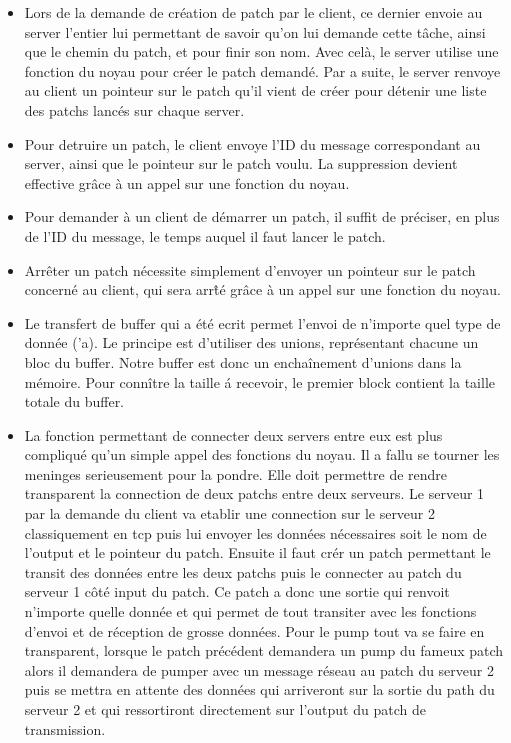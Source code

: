 \begin{itemize}

\item Lors de la demande de cr\'eation de patch par le client, ce dernier 
envoie au server l'entier lui permettant de savoir qu'on lui demande cette 
t\^ache, ainsi que le chemin du patch, et pour finir son nom. Avec cel\`a, le 
server utilise une fonction du noyau pour cr\'eer le patch demand\'e. Par
a suite, le server renvoye au client un pointeur sur le patch qu'il vient de 
cr\'eer pour d\'etenir une liste des patchs lanc\'es sur chaque server.
\newline
\item Pour detruire un patch, le client envoye l'ID du message correspondant 
au server, ainsi que le pointeur sur le patch voulu. La suppression devient 
effective gr\^ace \`a un appel sur une fonction du noyau.
\newline
\item Pour demander \`a un client de d\'emarrer un patch, il suffit de 
pr\'eciser, en plus de l'ID du message, le temps auquel il faut lancer le 
patch.
\newline
\item Arr\^eter un patch n\'ecessite simplement d'envoyer un pointeur sur le 
patch concern\'e au client, qui sera arr\^t\'e gr\^ace \`a un appel sur une 
fonction du noyau.
\newline
\item Le transfert de buffer qui a \'et\'e ecrit permet l'envoi de n'importe
quel type de donn\'ee ('a). Le principe est d'utiliser des unions, 
repr\'esentant chacune un bloc du buffer. Notre buffer est donc un 
encha\^inement d'unions dans la m\'emoire. Pour conn\^itre la taille \'a 
recevoir, le premier block contient la taille totale du buffer. 
\newline
\item La fonction permettant de connecter deux servers entre eux est plus compliqu\'e qu'un simple appel des fonctions du noyau. Il a fallu se tourner les meninges serieusement pour la pondre. Elle doit permettre de rendre transparent la connection de deux patchs entre deux serveurs. Le serveur 1 par la demande du client va etablir une connection sur le serveur 2 classiquement en tcp puis lui envoyer les donn\'ees n\'ecessaires soit le nom de l'output et le pointeur du patch. Ensuite il faut cr\'er un patch permettant le transit des donn\'ees entre les deux patchs puis le connecter au patch du serveur 1 c\^ot\'e input du patch. Ce patch a donc une sortie qui renvoit n'importe quelle donn\'ee et qui permet de tout transiter avec les fonctions d'envoi et de r\'eception de grosse donn\'ees. Pour le pump tout va se faire en transparent, lorsque le patch pr\'ec\'edent demandera un pump du fameux patch alors il demandera de pumper avec un message r\'eseau au patch du serveur 2 puis se mettra en attente des donn\'ees qui arriveront sur la sortie du path du serveur 2 et qui ressortiront directement sur l'output du patch de transmission.


\end{itemize}

